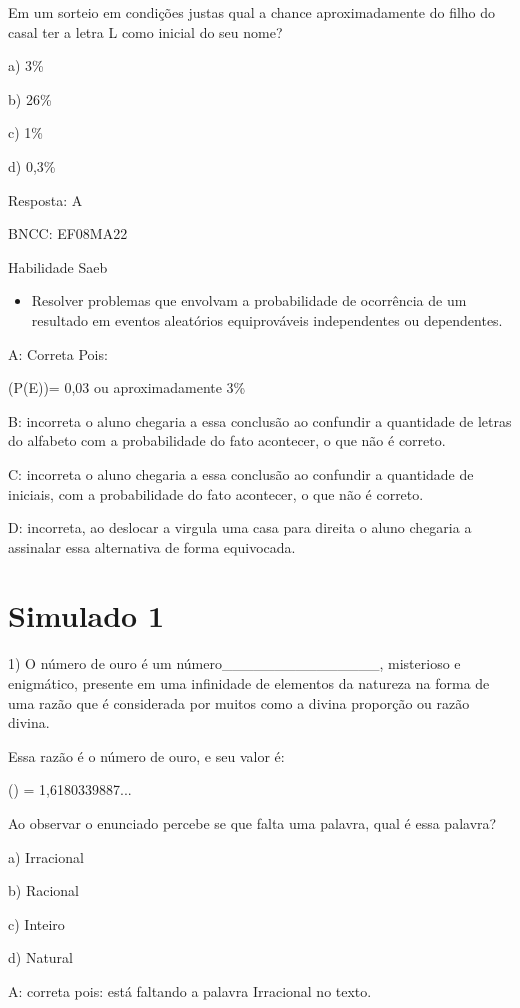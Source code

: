 Em um sorteio em condições justas qual a chance aproximadamente do filho
do casal ter a letra L como inicial do seu nome?

a) 3\%

b) 26\%

c) 1\%

d) 0,3\%

Resposta: A

BNCC: EF08MA22

Habilidade Saeb

\begin{itemize}
\tightlist
\item
  Resolver problemas que envolvam a probabilidade de ocorrência de um
  resultado em eventos aleatórios equiprováveis independentes ou
  dependentes.
\end{itemize}

A: Correta Pois:

(P(E))= 0,03 ou aproximadamente 3\%

B: incorreta o aluno chegaria a essa conclusão ao confundir a quantidade
de letras do alfabeto com a probabilidade do fato acontecer, o que não é
correto.

C: incorreta o aluno chegaria a essa conclusão ao confundir a quantidade
de iniciais, com a probabilidade do fato acontecer, o que não é correto.

D: incorreta, ao deslocar a virgula uma casa para direita o aluno
chegaria a assinalar essa alternativa de forma equivocada.

\section{Simulado 1}

1) O número de ouro é um número\_\_\_\_\_\_\_\_\_\_\_\_\_\_\_,
misterioso e enigmático, presente em uma infinidade de elementos da
natureza na forma de uma razão que é considerada por muitos como a
divina proporção ou razão divina.

Essa razão é o número de ouro, e seu valor é:

() = 1,6180339887...

Ao observar o enunciado percebe se que falta uma palavra, qual é essa
palavra?

a) Irracional

b) Racional

c) Inteiro

d) Natural

A: correta pois: está faltando a palavra Irracional no texto.


